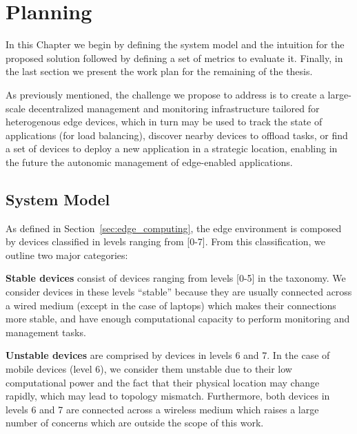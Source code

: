\chapter{Planning} \label{cha:planning}

In this Chapter we begin by defining the system model and the intuition for the proposed solution followed by defining a set of metrics to evaluate it. Finally, in the last section we present the work plan for the remaining of the thesis. 

As previously mentioned, the challenge we propose to address is to create a large-scale decentralized management and monitoring infrastructure tailored for heterogenous edge devices, which in turn may be used to track the state of applications (for load balancing), discover nearby devices to offload tasks, or find a set of devices to deploy a new application in a strategic location, enabling in the future the autonomic management of edge-enabled applications.

\section{System Model}

As defined in Section~\ref{sec:edge_computing}, the edge environment is composed by devices classified in levels ranging from [0-7]. From this classification, we outline two major categories:  

\textbf{Stable devices} consist of devices ranging from levels [0-5] in the taxonomy. We consider devices in these levels ``stable'' because they are usually connected across a wired medium (except in the case of laptops) which makes their connections more stable, and have enough computational capacity to perform monitoring and management tasks.

\textbf{Unstable devices} are comprised by devices in levels 6 and 7. In the case of mobile devices (level 6), we consider them unstable due to their low computational power and the fact that their physical location may change rapidly, which may lead to topology mismatch. Furthermore, both devices in levels 6 and 7 are connected across a wireless medium which raises a large number of concerns which are outside the scope of this work.

